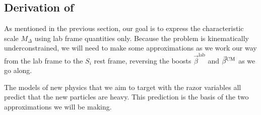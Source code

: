 \subsection{Derivation of \texorpdfstring{\mr}{MR} \label{sec:razor_mr}}

As mentioned in the previous section, our goal is to express the characteristic scale $M_\Delta$
using lab frame quantities only. Because the problem is kinematically underconstrained, we will
need to make some approximations as we work our way from the lab frame to the $S_i$ rest frame,
reversing the boosts $\vec{\beta}^{\textrm{lab}}$ and $\vec{\beta}^{\textrm{CM}}$ as we go along. 

The models of new physics that we aim to target with the razor variables all predict that the new
particles are heavy. This prediction is the basis of the two approximations we will be making. 

